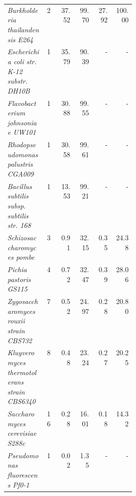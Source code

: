 \begin{table}[ht!]
\begin{center}
\begin{tabular}{p{0.3\linewidth} | c | r | r | r | r}
\footnotesize{\textit{Burkholderia thailandensis E264}} & \footnotesize{2} & 37.52 & 99.70 & 27.92 & 100.00 \\
\footnotesize{\textit{Escherichia coli str. K-12 substr. DH10B}} & \footnotesize{1} & 35.79 & 90.39 & - & - \\
\footnotesize{\textit{Flavobacterium johnsoniae UW101}} & \footnotesize{1} & 30.88 & 99.55 & - & - \\
\footnotesize{\textit{Rhodopseudomonas palustris CGA009}} & \footnotesize{1} & 30.58 & 99.61 & - & - \\
\footnotesize{\textit{Bacillus subtilis subsp. subtilis str. 168}} & \footnotesize{1} & 13.53 & 99.21 & - & - \\
\footnotesize{\textit{Schizosaccharomyces pombe}} & \footnotesize{3} & 0.91 & 32.15 & 0.35 & 24.38 \\
\footnotesize{\textit{Pichia pastoris GS115}} & \footnotesize{4} & 0.72 & 32.47 & 0.39 & 28.06 \\
\footnotesize{\textit{Zygosaccharomyces rouxii strain CBS732}} & \footnotesize{7} & 0.52 & 24.97 & 0.28 & 20.80 \\
\footnotesize{\textit{Kluyveromyces thermotolerans strain CBS6340}} & \footnotesize{8} & 0.48 & 23.24 & 0.27 & 20.25 \\
\footnotesize{\textit{Saccharomyces cerevisiae S288c}} & \footnotesize{16} & 0.28 & 16.01 & 0.18 & 14.32 \\
\footnotesize{\textit{Pseudomonas fluorescens Pf0-1}} & \footnotesize{1} & 0.02 & 1.35 & - & - \\
\end{tabular}
\end{center}
\label{supptable:m2_qc}
\end{table}


